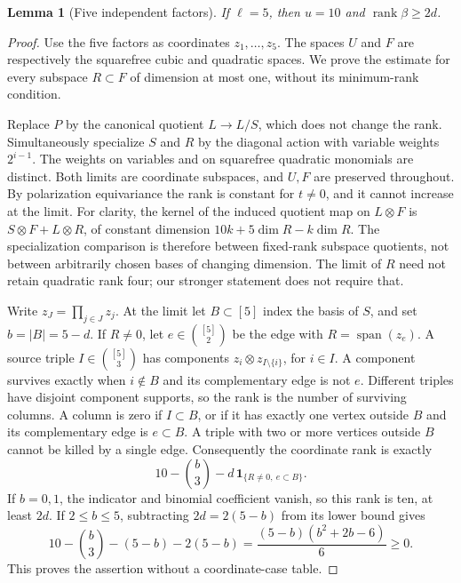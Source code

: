 \documentclass[11pt]{amsart}
\newtheorem{lemma}[theorem]{Lemma}
\theoremstyle{remark}
\numberwithin{equation}{section}
\newcommand{\Span}{\operatorname{span}}
\newcommand{\rank}{\operatorname{rank}}
\begin{document}
\begin{lemma}[Five independent factors]\label{lem:independent}
If \(\ell=5\), then \(u=10\) and \(\rank\beta\ge2d\).
\end{lemma}
\begin{proof}
Use the five factors as coordinates \(z_1,\ldots,z_5\). The spaces
\(U\) and \(F\) are respectively the squarefree cubic and quadratic
spaces. We prove the estimate for every subspace \(R\subset F\) of
dimension at most one, without its minimum-rank condition.

Replace \(P\) by the canonical quotient \(L\to L/S\), which does
not change the rank. Simultaneously specialize \(S\) and \(R\) by the
diagonal action with variable weights \(2^{i-1}\). The weights on
variables and on squarefree quadratic monomials are distinct. Both limits
are coordinate subspaces, and \(U,F\) are preserved throughout. By
polarization equivariance the rank is constant for \(t\ne0\), and
it cannot increase at the limit. For clarity, the kernel of the induced
quotient map on \(L\otimes F\) is
\(S\otimes F+L\otimes R\), of constant dimension
\(10k+5\dim R-k\dim R\). The specialization comparison is therefore
between fixed-rank subspace quotients, not between arbitrarily chosen
bases of changing dimension. The limit of \(R\) need not retain
quadratic rank four; our stronger statement does not require that.

Write \(z_J=\prod_{j\in J}z_j\). At the limit let \(B\subset[5]\) index the basis of \(S\), and set
\(b=|B|=5-d\). If \(R\ne0\), let \(e\in\binom{[5]}2\) be
the edge with \(R=\Span(z_e)\). A source triple \(I\in\binom{[5]}3\)
has components \(z_i\otimes z_{I\setminus\{i\}}\), for \(i\in I\).
A component survives exactly when \(i\notin B\) and its complementary
edge is not \(e\). Different triples have disjoint component supports,
so the rank is the number of surviving columns. A column is zero if
\(I\subset B\), or if it has exactly one vertex outside \(B\) and
its complementary edge is \(e\subset B\). A triple with two or more
vertices outside \(B\) cannot be killed by a single edge.
Consequently the coordinate rank is exactly
\begin{equation}\label{eq:triple-count}
 10-\binom b3-d\,\mathbf1_{\{R\ne0,\ e\subset B\}}.
\end{equation}
If \(b=0,1\), the indicator and binomial coefficient vanish, so this
rank is ten, at least \(2d\). If \(2\le b\le5\), subtracting
\(2d=2(5-b)\) from its lower bound gives
\[
 10-\binom b3-(5-b)-2(5-b)
 =\frac{(5-b)(b^2+2b-6)}6\ge0.
\]
This proves the assertion without a coordinate-case table.
\end{proof}
\end{document}
